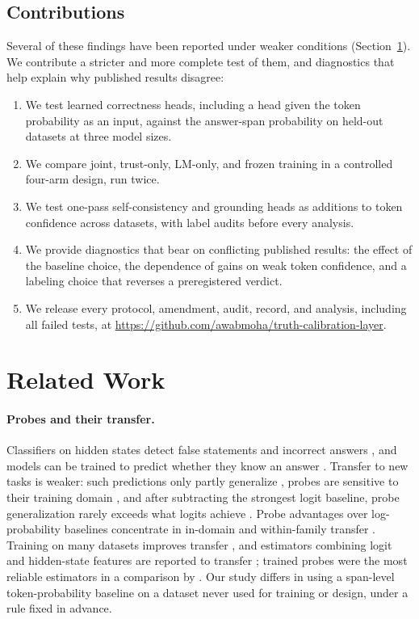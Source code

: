 \documentclass[10pt]{article}
\newif\ifanon
\newcommand{\repo}{\ifanon an anonymized repository provided with the submission\else \url{https://github.com/awabmoha/truth-calibration-layer}\fi}
\begin{document}
\subsection{Contributions}

Several of these findings have been reported under weaker conditions (Section~\ref{sec:related}). We contribute a stricter and more complete test of them, and diagnostics that help explain why published results disagree:
\begin{enumerate}
\item We test learned correctness heads, including a head given the token probability as an input, against the answer-span probability on held-out datasets at three model sizes.
\item We compare joint, trust-only, LM-only, and frozen training in a controlled four-arm design, run twice.
\item We test one-pass self-consistency and grounding heads as additions to token confidence across datasets, with label audits before every analysis.
\item We provide diagnostics that bear on conflicting published results: the effect of the baseline choice, the dependence of gains on weak token confidence, and a labeling choice that reverses a preregistered verdict.
\item We release every protocol, amendment, audit, record, and analysis, including all failed tests, at \repo.
\end{enumerate}

\section{Related Work}
\label{sec:related}

\paragraph{Probes and their transfer.} Classifiers on hidden states detect false statements and incorrect answers \citep{azaria-mitchell-2023-internal,burns2023discovering,marks2024geometry}, and models can be trained to predict whether they know an answer \citep{kadavath2022language}. Transfer to new tasks is weaker: such predictions only partly generalize \citep{kadavath2022language}, probes are sensitive to their training domain \citep{chwang2024androids}, and after subtracting the strongest logit baseline, probe generalization rarely exceeds what logits achieve \citep{orgad2025llms}. Probe advantages over log-probability baselines concentrate in in-domain and within-family transfer \citep{duan2026probes}. Training on many datasets improves transfer \citep{liu2024universal}, and estimators combining logit and hidden-state features are reported to transfer \citep{liu2024supervised}; trained probes were the most reliable estimators in a comparison by \citet{mahaut2024factual}. Our study differs in using a span-level token-probability baseline on a dataset never used for training or design, under a rule fixed in advance.
\end{document}
